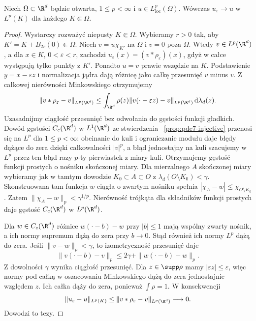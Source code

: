 \begin{twierdzenie}
\label{thm:pde7-approx-id}
Niech $\Omega\subset\R^d$ będzie otwarta,
$1\le p<\infty$ i $u\in L^p_{\mathrm{loc}}(\Omega)$.
Wówczas $u_\varepsilon\to u$ w $L^p(K)$ dla każdego
$K\Subset\Omega$.
\end{twierdzenie}
\begin{proof}
Wystarczy rozważyć niepusty $K\Subset\Omega$.
Wybieramy $r>0$ tak, aby
$K' = K+\overline{B_{2r}(0)}\Subset\Omega$.
Niech $v=u\chi_{K'}$ na $\Omega$ i $v=0$
poza $\Omega$. Wtedy $v\in L^p(\R^d)$, a dla
$x\in K$, $0<\varepsilon<r$, zachodzi
$u_\varepsilon(x)=(v*\rho_\varepsilon)(x)$,
gdyż w całce występują tylko punkty z $K'$.
Ponadto $u=v$ prawie wszędzie na $K$.
Podstawienie $y=x-\varepsilon z$ i normalizacja
jądra dają różnicę jako całkę przesunięć $v$
minus $v$. Z całkowej nierówności Minkowskiego
otrzymujemy
\[
 \|v*\rho_\varepsilon-v\|_{L^p(\R^d)}
 \le\int_{\R^d}\rho(z)
 \|v(\cdot-\varepsilon z)-v\|_{L^p(\R^d)}
 \,\mathrm d\lambda_d(z).
\]
Uzasadnijmy ciągłość przesunięć bez odwołania
do gęstości funkcji gładkich. Dowód gęstości
$C_c(\R^d)$ w $L^1(\R^d)$ ze stwierdzenia
~\ref{prop:pde7-injective} przenosi się na $L^p$
dla $1\le p<\infty$: obcinanie do kuli
i ograniczanie modułu daje błędy dążące do zera
dzięki całkowalności $|v|^p$, a błąd jednostajny
na kuli szacujemy w $L^p$ przez ten błąd razy
$p$-ty pierwiastek z miary kuli.
Otrzymujemy gęstość funkcji prostych o nośniku
skończonej miary. Dla mierzalnego $A$ skończonej
miary wybieramy jak w tamtym dowodzie
$K_0\subset A\subset O$ z
$\lambda_d(O\setminus K_0)<\gamma$.
Skonstruowana tam funkcja $w$ ciągła o zwartym
nośniku spełnia $|\chi_A-w|\le\chi_{O\setminus K_0}$.
Zatem $\|\chi_A-w\|_p<\gamma^{1/p}$.
Nierówność trójkąta dla składników funkcji
prostych daje gęstość $C_c(\R^d)$ w $L^p(\R^d)$.

Dla $w\in C_c(\R^d)$ różnice $w(\cdot-b)-w$
przy $|b|\le1$ mają wspólny zwarty nośnik,
a ich normy supremum dążą do zera przy $b\to0$.
Stąd również ich normy $L^p$ dążą do zera.
Jeśli $\|v-w\|_p<\gamma$, to izometryczność
przesunięć daje
\[
 \|v(\cdot-b)-v\|_p
 \le 2\gamma+\|w(\cdot-b)-w\|_p.
\]
Z dowolności $\gamma$ wynika ciągłość przesunięć.
Dla $z\in\supp\rho$ mamy $|\varepsilon z|\le\varepsilon$,
więc normy pod całką w oszacowaniu Minkowskiego
dążą do zera jednostajnie względem $z$.
Ich całka dąży do zera, ponieważ $\int\rho=1$.
W konsekwencji
\[
 \|u_\varepsilon-u\|_{L^p(K)}
 \le\|v*\rho_\varepsilon-v\|_{L^p(\R^d)}
 \longrightarrow0.
\]
Dowodzi to tezy.
\end{proof}

